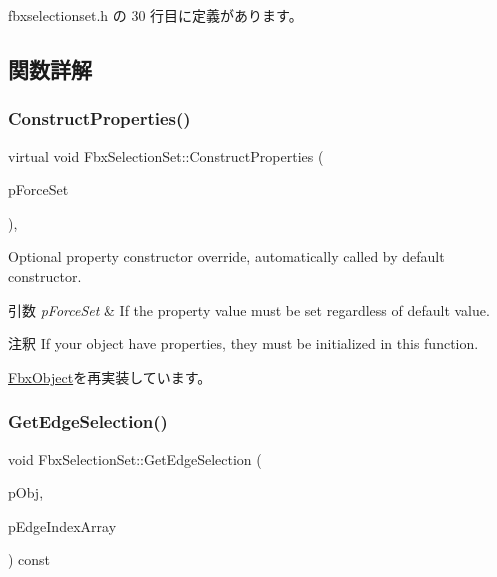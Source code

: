  fbxselectionset.\+h の 30 行目に定義があります。



\subsection{関数詳解}
\mbox{\label{class_fbx_selection_set_adcb0af5e3ecfd0957fbf0fe6958d8d6b}} 
\subsubsection{\texorpdfstring{Construct\+Properties()}{ConstructProperties()}}
{\footnotesize\ttfamily virtual void Fbx\+Selection\+Set\+::\+Construct\+Properties (\begin{DoxyParamCaption}\item[{bool}]{p\+Force\+Set }\end{DoxyParamCaption})\hspace{0.3cm}{\ttfamily [protected]}, {\ttfamily [virtual]}}

Optional property constructor override, automatically called by default constructor. 
\begin{DoxyParams}{引数}
{\em p\+Force\+Set} & If the property value must be set regardless of default value. \\
\hline
\end{DoxyParams}
\begin{DoxyRemark}{注釈}
If your object have properties, they must be initialized in this function. 
\end{DoxyRemark}


\hyperlink{class_fbx_object_ad44f814323dc1b5e78bff1bfc608b4bb}{Fbx\+Object}を再実装しています。

\mbox{\label{class_fbx_selection_set_a1c3c07b58ae08bf77ce044be79dff6c4}} 
\subsubsection{\texorpdfstring{Get\+Edge\+Selection()}{GetEdgeSelection()}}
{\footnotesize\ttfamily void Fbx\+Selection\+Set\+::\+Get\+Edge\+Selection (\begin{DoxyParamCaption}\item[{\hyperlink{class_fbx_object}{Fbx\+Object} $\ast$}]{p\+Obj,  }\item[{\hyperlink{class_fbx_array}{Fbx\+Array}$<$ int $>$ \&}]{p\+Edge\+Index\+Array }\end{DoxyParamCaption}) const}

